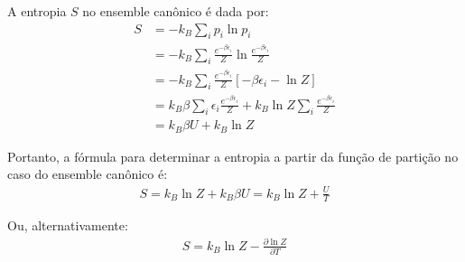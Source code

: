 \documentclass[fleqn,a4paper]{article}
\begin{document}
A entropia $S$ no ensemble canônico é dada por:
\begin{align}
S &= -k_B \sum_i p_i \ln p_i \\
&= -k_B \sum_i \frac{e^{-\beta \epsilon_i}}{Z} \ln \frac{e^{-\beta \epsilon_i}}{Z} \\
&= -k_B \sum_i \frac{e^{-\beta \epsilon_i}}{Z} [-\beta \epsilon_i - \ln Z] \\
&= k_B \beta \sum_i \epsilon_i \frac{e^{-\beta \epsilon_i}}{Z} + k_B \ln Z \sum_i \frac{e^{-\beta \epsilon_i}}{Z} \\
&= k_B \beta U + k_B \ln Z
\end{align}

Portanto, a fórmula para determinar a entropia a partir da função de partição no caso do ensemble canônico é:
\begin{align}
S = k_B \ln Z + k_B \beta U = k_B \ln Z + \frac{U}{T}
\end{align}

Ou, alternativamente:
\begin{align}
S = k_B \ln Z - \frac{\partial \ln Z}{\partial T}
\end{align}
\end{document}
